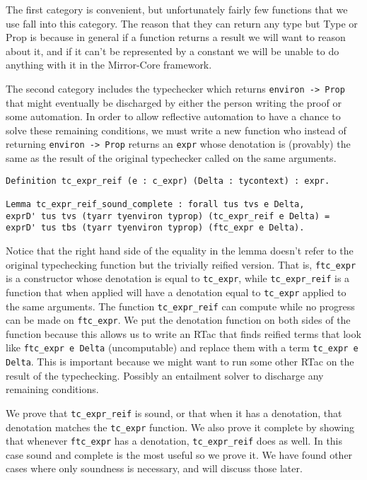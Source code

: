 \documentclass{puthesis}
\begin{document}
The first category is convenient, but unfortunately fairly few functions that
we use fall into this category. The reason that they can return any
type but Type or Prop is because in general if a function returns a result we
will want to reason about it, and if it can't be represented by a constant
we will be unable to do anything with it in the Mirror-Core framework.

The second category includes the typechecker which returns
\lstinline|environ -> Prop| that might eventually be discharged
by either the person writing the proof or some automation. 
In order to allow reflective automation to have a chance to solve these remaining
conditions, we must write a new function who instead of returning
\lstinline|environ -> Prop| returns an \lstinline|expr| whose denotation
is (provably) the same as the result of the original typechecker called
on the same arguments.

\begin{lstlisting}
Definition tc_expr_reif (e : c_expr) (Delta : tycontext) : expr.

Lemma tc_expr_reif_sound_complete : forall tus tvs e Delta,
exprD' tus tvs (tyarr tyenviron typrop) (tc_expr_reif e Delta) =
exprD' tus tbs (tyarr tyenviron typrop) (ftc_expr e Delta).
\end{lstlisting}

Notice that the right hand side of the equality in the lemma doesn't
refer to the original typechecking function but the trivially reified
version. That is, \lstinline|ftc_expr| is a constructor whose denotation is equal
to \lstinline|tc_expr|, while \lstinline|tc_expr_reif| is a function that when applied will have
a denotation equal to \lstinline|tc_expr| applied to the same arguments. The function
\lstinline|tc_expr_reif| can compute while no progress can be made on \lstinline|ftc_expr|.
We put the denotation function on both sides of the function because
this allows us to write an RTac that finds reified terms that look like
\lstinline|ftc_expr e Delta| (uncomputable) and replace them with a term
\lstinline|tc_expr e Delta|. This is important because we might want
to run some other RTac on the result of the typechecking. Possibly
an entailment solver to discharge any remaining conditions. 

We prove that \lstinline|tc_expr_reif| is sound, or that when it has a denotation,
that denotation matches the \lstinline|tc_expr| function. We also prove it complete by
showing that whenever \lstinline|ftc_expr| has a denotation, \lstinline|tc_expr_reif| does as well.
In this case sound and complete is the most useful so we prove it. We have
found other cases where only soundness is necessary, and will discuss those
later.
\end{document}
